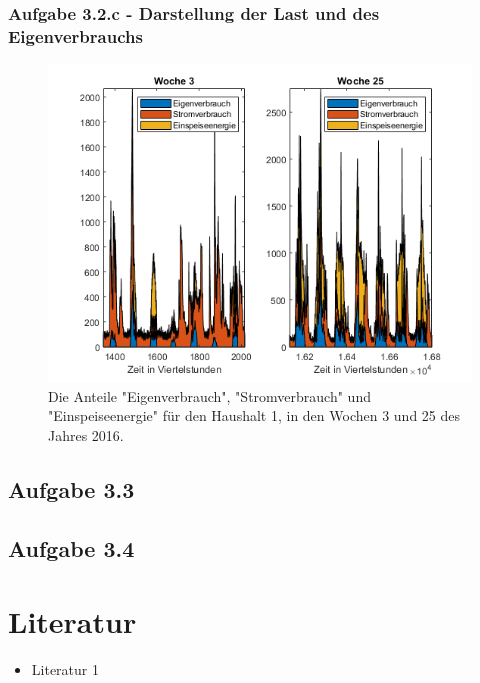 \documentclass[a4paper,12pt]{article}
\begin{document}
	\subsubsection{Aufgabe 3.2.c - Darstellung der Last und des Eigenverbrauchs}
	
	\begin{figure}[H]
		\centering
		\includegraphics[width=12cm]{img/results/LastundEigenverbrauch}
		\caption{Die Anteile "Eigenverbrauch", "Stromverbrauch" und "Einspeiseenergie" für den Haushalt 1, in den Wochen 3 und 25 des Jahres 2016.}
	\end{figure}
	\subsection{Aufgabe 3.3}
	\subsection{Aufgabe 3.4}
	\newpage
	\section{Literatur}
	\begin{itemize}
		\item Literatur 1
	\end{itemize}
	\listoffigures
\end{document}
